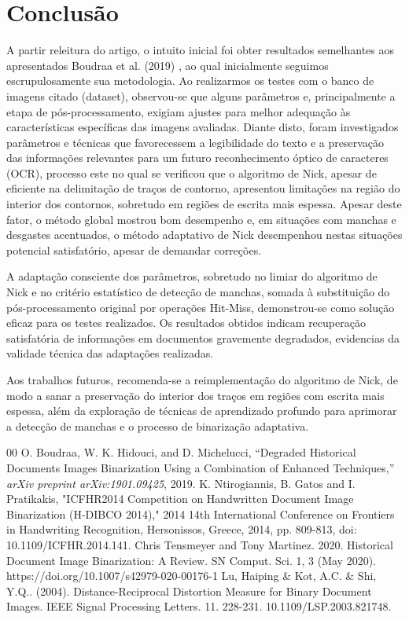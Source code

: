 \documentclass[conference]{IEEEtran}
\begin{document}
\section{Conclusão}
A partir releitura do artigo, o intuito inicial foi obter resultados semelhantes aos apresentados Boudraa et al. (2019) \cite{boudraa2019}, ao qual inicialmente seguimos escrupulosamente sua metodologia. Ao realizarmos os testes com o banco de imagens citado (dataset), observou-se que alguns parâmetros e, principalmente a etapa de pós-processamento, exigiam ajustes para melhor adequação às características específicas das imagens avaliadas.
Diante disto, foram investigados parâmetros e técnicas que favorecessem a legibilidade do texto e a preservação das informações relevantes para um futuro reconhecimento óptico de caracteres (OCR), processo este no qual se verificou que o algoritmo de Nick, apesar de eficiente na delimitação de traços de contorno, apresentou limitações na região do interior dos contornos, sobretudo em regiões de escrita mais espessa. Apesar deste fator, o método global mostrou bom desempenho e, em situações com manchas e desgastes acentuados, o método adaptativo de Nick desempenhou nestas situações potencial satisfatório, apesar de demandar correções.

A adaptação consciente dos parâmetros, sobretudo no limiar do algoritmo de Nick e no critério estatístico de detecção de manchas, somada à substituição do pós-processamento original por operações Hit-Miss, demonstrou-se como solução eficaz para os testes realizados. Os resultados obtidos indicam recuperação satisfatória de informações em documentos gravemente degradados, evidencias da validade técnica das adaptações realizadas. 

Aos trabalhos futuros, recomenda-se a reimplementação do algoritmo de Nick, de modo a sanar a preservação do interior dos traços em regiões com escrita mais espessa, além da exploração de técnicas de aprendizado profundo para aprimorar a detecção de manchas e o processo de binarização adaptativa.
\begin{thebibliography}{00}
O. Boudraa, W. K. Hidouci, and D. Michelucci, ``Degraded Historical Documents Images Binarization Using a Combination of Enhanced Techniques,'' \textit{arXiv preprint arXiv:1901.09425}, 2019.
K. Ntirogiannis, B. Gatos and I. Pratikakis, "ICFHR2014 Competition on Handwritten Document Image Binarization (H-DIBCO 2014)," 2014 14th International Conference on Frontiers in Handwriting Recognition, Hersonissos, Greece, 2014, pp. 809-813, doi: 10.1109/ICFHR.2014.141.
Chris Tensmeyer and Tony Martinez. 2020. Historical Document Image Binarization: A Review. SN Comput. Sci. 1, 3 (May 2020). https://doi.org/10.1007/s42979-020-00176-1
Lu, Haiping \& Kot, A.C. \& Shi, Y.Q.. (2004). Distance-Reciprocal Distortion Measure for Binary Document Images. IEEE Signal Processing Letters. 11. 228-231. 10.1109/LSP.2003.821748. 
\end{thebibliography}
\end{document}
